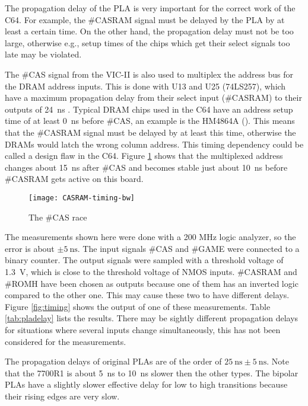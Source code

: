 The propagation delay of the PLA is very important for the correct work of
the C64. For example, the \#CASRAM signal must be delayed by the PLA by at
least a certain time. On the other hand, the propagation delay must not be
too large, otherwise e.g., setup times of the chips which get their select
signals too late may be violated.

The \#CAS signal from the VIC-II is also used to multiplex the address bus
for the DRAM address inputs. This is done with U13 and U25 (74LS257), which
have a maximum propagation delay from their select input (\#CASRAM) to their
outputs of \SI{24}{\nano\second} \cite{TI257}. Typical DRAM chips used in
the C64 have an address setup time of at least \SI{0}{\nano\second} before
\#CAS, an example is the HM4864A (\cite{Hita4846}). This means that the
\#CASRAM signal must be delayed by at least this time, otherwise the DRAMs
would latch the wrong column address. This timing dependency could be called
a design flaw in the C64. Figure \ref{fig:casram-race} shows that the
multiplexed address changes about \SI{15}{\nano\second} after \#CAS and
becomes stable just about \SI{10}{\nano\second} before \#CASRAM gets active on
this board.

\begin{figure}
    \centering
    \texttt{[image: CASRAM-timing-bw]}
    \caption{The \#CAS race}
    \label{fig:casram-race}
\end{figure}

The measurements shown here were done with a 200 MHz logic analyzer, so the
error is about $\pm \SI{5}{\nano\second}$. The input signals \#CAS and \#GAME
were connected to a binary counter. The output signals were sampled with a
threshold voltage of \SI{1.3}{\volt}, which is close to the threshold
voltage of NMOS inputs. \#CASRAM and \#ROMH have been chosen as outputs
because one of them has an inverted logic compared to the other one. This
may cause these two to have different delays. Figure \ref{fig:timing} shows
the output of one of these measurements. Table \ref{tab:pladelay} lists the
results. There may be sightly different propagation delays for situations
where several inputs change simultaneously, this has not been considered for
the measurements.

The propagation delays of original PLAs are of the order of
$\SI{25}{\nano\second} \pm \SI{5}{\nano\second}$. Note that the 7700R1 is
about \SI{5}{\nano\second} to \SI{10}{\nano\second} slower then the other
types. The bipolar PLAs have a slightly slower effective delay for low to
high transitions because their rising edges are very slow.


